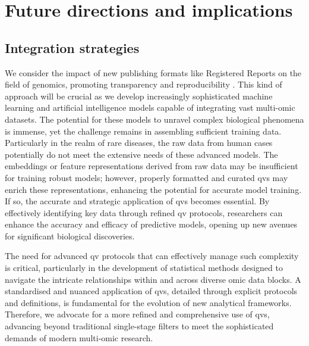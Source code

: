 \section{Future directions and implications} 
\subsection{Integration strategies}
We consider the impact of new publishing formats like Registered Reports on the field of genomics, promoting transparency and reproducibility 
\cite{chambers2014instead}. %
This kind of approach will be crucial as we develop increasingly sophisticated machine learning and artificial intelligence models capable of integrating vast multi-omic datasets. The potential for these models to unravel complex biological phenomena is immense, yet the challenge remains in assembling sufficient training data. Particularly in the realm of rare diseases, the raw data from human cases potentially do not meet the extensive needs of these advanced models. The embeddings or feature representations derived from raw data may be insufficient for training robust models; however, properly formatted and curated \ac{qv}s may enrich these representations, enhancing the potential for accurate model training. If so, the accurate and strategic application of \ac{qv}s becomes essential. By effectively identifying key data through refined \ac{qv} protocols, researchers can enhance the accuracy and efficacy of predictive models, opening up new avenues for significant biological discoveries.

The need for advanced \ac{qv} protocols that can effectively manage such complexity is critical, particularly in the development of statistical methods designed to navigate the intricate relationships within and across diverse omic data blocks. A standardised and nuanced application of \ac{qv}s, detailed through explicit protocols and definitions, is fundamental for the evolution of new analytical frameworks. Therefore, we advocate for a more refined and comprehensive use of \ac{qv}s, advancing beyond traditional single-stage filters to meet the sophisticated demands of modern multi-omic research. 

